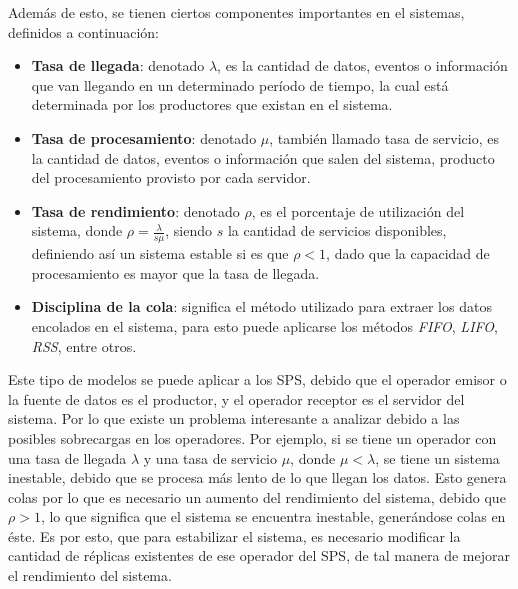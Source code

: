 Además de esto, se tienen ciertos componentes importantes en el sistemas, definidos a continuación:
\begin{itemize}
	\item \textbf{Tasa de llegada}: denotado $\lambda$, es la cantidad de datos, eventos o información que van llegando en un determinado período de tiempo, la cual está determinada por los productores que existan en el sistema.
	\item \textbf{Tasa de procesamiento}: denotado $\mu$, también llamado tasa de servicio, es la cantidad de datos, eventos o información que salen del sistema, producto del procesamiento provisto por cada servidor.
	\item \textbf{Tasa de rendimiento}: denotado $\rho$, es el porcentaje de utilización del sistema, donde $\rho = \frac{\lambda}{s\mu}$, siendo $s$ la cantidad de servicios disponibles, definiendo así un sistema estable si es que $\rho < 1$, dado que la capacidad de procesamiento es mayor que la tasa de llegada.
	\item \textbf{Disciplina de la cola}: significa el método utilizado para extraer los datos encolados en el sistema, para esto puede aplicarse los métodos \textit{FIFO}, \textit{LIFO}, \textit{RSS}, entre otros.
\end{itemize}

Este tipo de modelos se puede aplicar a los SPS, debido que el operador emisor o la fuente de datos es el productor, y el operador receptor es el servidor del sistema. Por lo que existe un problema interesante a analizar debido a las posibles sobrecargas en los operadores. Por ejemplo, si se tiene un operador con una tasa de llegada $\lambda$ y una tasa de servicio $\mu$, donde $\mu < \lambda$, se tiene un sistema inestable, debido que se procesa más lento de lo que llegan los datos. Esto genera colas por lo que es necesario un aumento del rendimiento del sistema, debido que $\rho > 1 $, lo que significa que el sistema se encuentra inestable, generándose colas en éste. Es por esto, que para estabilizar el sistema, es necesario modificar la cantidad de réplicas existentes de ese operador del SPS, de tal manera de mejorar el rendimiento del sistema.